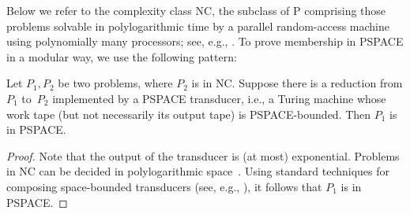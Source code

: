 \documentclass[a4paper,UKenglish,cleveref, autoref,mathscr]{lipics-v2019}
\newcommand{\1}{\mathbbm{1}}
\begin{document}
Below we refer to the complexity class NC, the subclass of P comprising those problems solvable in polylogarithmic time by a parallel random-access machine using polynomially many processors; see, e.g., \cite[Chapter 15]{Pap94}.
To prove membership in PSPACE in a modular way, we use the following pattern:
\begin{lemma} \label{lem:PSPACE-transducer}
Let $P_1, P_2$ be two problems, where $P_2$ is in NC.
Suppose there is a reduction from $P_1$ to~$P_2$ implemented by a PSPACE transducer, i.e., a Turing machine whose work tape (but not necessarily its output tape) is PSPACE-bounded.
Then $P_1$ is in PSPACE.
\end{lemma}
\begin{proof}
Note that the output of the transducer is (at most) exponential.
Problems in NC can be decided in polylogarithmic space~\cite[Theorem~4]{Borodin77}.
Using standard techniques for composing space-bounded transducers (see, e.g., \cite[Proposition~8.2]{Pap94}), it follows that $P_1$ is in PSPACE.
\end{proof}
\end{document}
